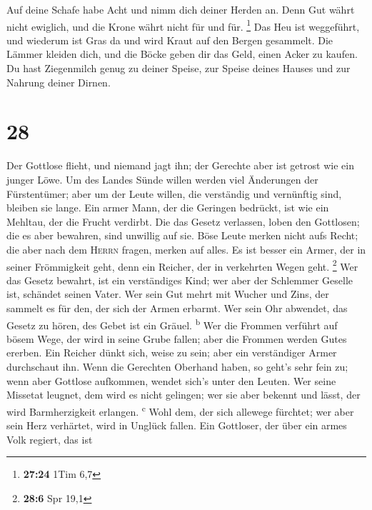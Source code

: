  Auf deine Schafe habe Acht und nimm dich deiner Herden
an.  Denn Gut währt nicht ewiglich, und die Krone währt
nicht für und für. \footnote{\textbf{27:24} 1Tim 6,7} 
Das Heu ist weggeführt, und wiederum ist Gras da und wird Kraut auf den
Bergen gesammelt.  Die Lämmer kleiden dich, und die Böcke
geben dir das Geld, einen Acker zu kaufen.  Du hast
Ziegenmilch genug zu deiner Speise, zur Speise deines Hauses und zur
Nahrung deiner Dirnen.

\hypertarget{section-27}{%
\section{28}\label{section-27}}

 Der Gottlose flieht, und niemand jagt ihn; der Gerechte
aber ist getrost wie ein junger Löwe.  Um des Landes Sünde
willen werden viel Änderungen der Fürstentümer; aber um der Leute
willen, die verständig und vernünftig sind, bleiben sie lange.
 Ein armer Mann, der die Geringen bedrückt, ist wie ein
Mehltau, der die Frucht verdirbt.  Die das Gesetz
verlassen, loben den Gottlosen; die es aber bewahren, sind unwillig auf
sie.  Böse Leute merken nicht aufs Recht; die aber nach
dem \textsc{Herrn} fragen, merken auf alles.  Es ist
besser ein Armer, der in seiner Frömmigkeit geht, denn ein Reicher, der
in verkehrten Wegen geht. \footnote{\textbf{28:6} Spr 19,1}
 Wer das Gesetz bewahrt, ist ein verständiges Kind; wer
aber der Schlemmer Geselle ist, schändet seinen Vater. 
Wer sein Gut mehrt mit Wucher und Zins, der sammelt es für den, der sich
der Armen erbarmt.  Wer sein Ohr abwendet, das Gesetz zu
hören, des Gebet ist ein Gräuel. \textsuperscript{b}  Wer
die Frommen verführt auf bösem Wege, der wird in seine Grube fallen;
aber die Frommen werden Gutes ererben.  Ein Reicher dünkt
sich, weise zu sein; aber ein verständiger Armer durchschaut ihn.
 Wenn die Gerechten Oberhand haben, so geht's sehr fein
zu; wenn aber Gottlose aufkommen, wendet sich's unter den Leuten.
 Wer seine Missetat leugnet, dem wird es nicht gelingen;
wer sie aber bekennt und lässt, der wird Barmherzigkeit erlangen.
\textsuperscript{c}  Wohl dem, der sich allewege
fürchtet; wer aber sein Herz verhärtet, wird in Unglück fallen.
 Ein Gottloser, der über ein armes Volk regiert, das ist

